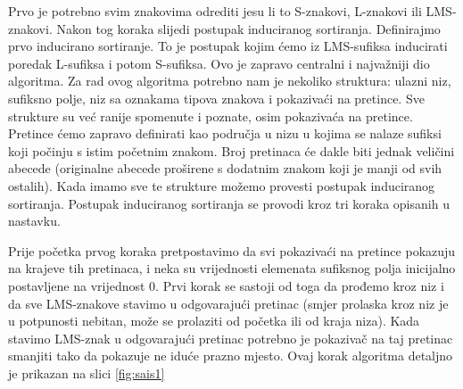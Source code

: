 Prvo je potrebno svim znakovima odrediti jesu li to S-znakovi, L-znakovi ili LMS-znakovi. Nakon tog koraka slijedi postupak induciranog sortiranja. Definirajmo prvo inducirano sortiranje. To je postupak kojim ćemo iz LMS-sufiksa inducirati poredak L-sufiksa i potom S-sufiksa. Ovo je zapravo centralni i najvažniji dio algoritma. Za rad ovog algoritma potrebno nam je nekoliko struktura: ulazni niz, sufiksno polje, niz sa oznakama tipova znakova i pokazivaći na pretince. Sve strukture su već ranije spomenute i poznate, osim pokazivaća na pretince. Pretince ćemo zapravo definirati kao područja u nizu u kojima se nalaze sufiksi koji počinju s  istim početnim znakom. Broj pretinaca će dakle biti jednak veličini abecede (originalne abecede proširene s dodatnim znakom koji je manji od svih ostalih). Kada imamo sve te strukture možemo provesti postupak induciranog sortiranja. Postupak induciranog sortiranja se provodi kroz tri koraka opisanih u nastavku.

Prije početka prvog koraka pretpostavimo da svi pokazivaći na pretince pokazuju na krajeve tih pretinaca, i neka su vrijednosti elemenata sufiksnog polja inicijalno postavljene na vrijednost 0. Prvi korak se sastoji od toga da prođemo kroz niz i da sve LMS-znakove stavimo u odgovarajući pretinac (smjer prolaska kroz niz je u potpunosti nebitan, može se prolaziti od početka ili od kraja niza). Kada stavimo LMS-znak u odgovarajući pretinac potrebno je pokazivač na taj pretinac smanjiti tako da pokazuje ne iduće prazno mjesto. Ovaj korak algoritma detaljno je prikazan na slici \ref{fig:sais1}

